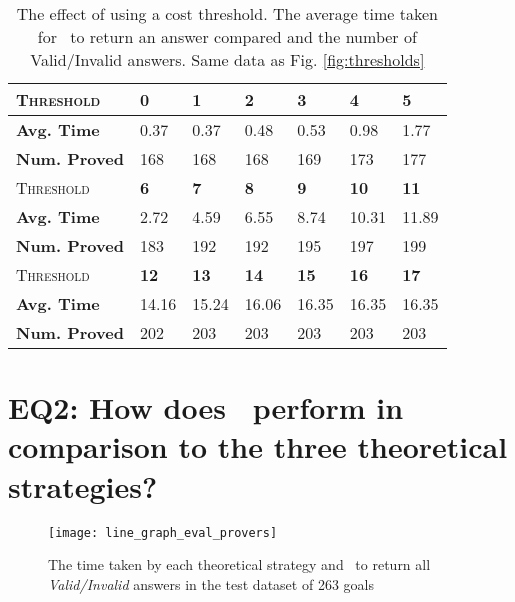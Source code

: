 \begin{table}
	\caption[The effect of using a cost threshold]{The effect of using a cost threshold. The average time taken for \where~to return an answer compared and the number of Valid/Invalid answers. Same data as Fig. \ref{fig:thresholds}}
	\begin{tabularx}{0.9\textwidth}{@{}l|Z|Z|Z|Z|Z|Z@{}}

		\textsc{Threshold} & \textbf{0} & \textbf{1} & \textbf{2} & \textbf{3} & \textbf{4} & \textbf{5} \\
		\midrule
		\textbf{Avg. Time} & 0.37 & 0.37 & 0.48 & 0.53 & 0.98 & 1.77  \\
		\textbf{Num. Proved} & 168 & 168 & 168 & 169 & 173 & 177  \\
		\midrule
		\midrule
		\textsc{Threshold}  & \textbf{6} & \textbf{7} & \textbf{8} & \textbf{9} & \textbf{10} & \textbf{11}  \\
		\midrule
		\textbf{Avg. Time} & 2.72 & 4.59 & 6.55 & 8.74 & 10.31 & 11.89  \\
		\textbf{Num. Proved} & 183 & 192 & 192 & 195 & 197 & 199 \\
		\midrule
		\midrule
		\textsc{Threshold} & \textbf{12} & \textbf{13} & \textbf{14} & \textbf{15} & \textbf{16} & \textbf{17} \\
		\midrule
		\textbf{Avg. Time} & 14.16 & 15.24 & 16.06 & 16.35 & 16.35 & 16.35 \\
		\textbf{Num. Proved}  & 202 & 203 & 203 & 203 & 203 & 203 \\
		
	\end{tabularx}
	\label{table:threshold}
\end{table}

\section{EQ2: How does \where~perform in comparison to the three theoretical strategies?}


\begin{figure}
	\centering
	\texttt{[image: line\_graph\_eval\_provers]}
	\caption{The time taken by each theoretical strategy and \where~to return all \textit{Valid/Invalid} answers in the test dataset of 263 goals}
	\label{fig:line_graph_eval_provers}
\end{figure}

